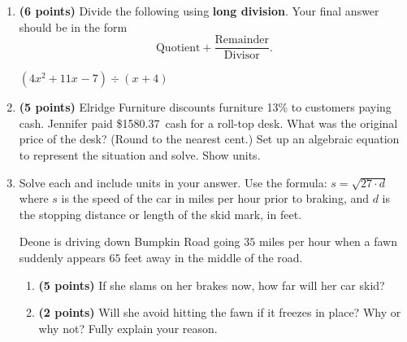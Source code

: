 \documentclass[12pt]{amsart}
\begin{document}
\begin{enumerate}
  
\vfill \vfill \vfill
\def \a{4}\def \b{4}\def \c{-5}\def \r{13}\def \monicpol{x^{}+4}\def \longnbad{4x^{2}+11x^{}-7}\def \anspol{4x^{}-5}
\item {\bf (6 points)} 
 Divide the following using {\bf long division}. Your final answer should be in the form $$ \text{Quotient} + \dfrac{\text{Remainder}}{\text{Divisor}}.$$

\vspace{3mm}

$(\longnbad) \div (\monicpol)$

\vfill  \vfill \vfill
\newpage\def \discount{13}\def \paid{1580.37}\def \rainy{9.35}\def \orcost{1816.52}\def \purcost{1398.56}\def \orrainy{10.75}
\item {\bf (5 points)} 
 Elridge Furniture discounts furniture \discount\% to customers paying cash. Jennifer paid \$\paid\ cash for a roll-top desk. What was the original price of the desk? (Round to the nearest cent.) Set up an algebraic equation to represent the situation and solve. Show units.

\vfill 
\def \insvar{27}\def \d{65}\def \zerospeed{41.89}\def \slimit{35}\def \s{52}\def \skidd{100.148}\def \safed{45.37}\def \rsafed{45}

 
\item Solve each and include units in your answer. Use the formula: $s = \sqrt{\insvar \cdot d}$ where $s$ is the speed of the car in miles per hour prior to braking, and $d$ is the stopping distance or length of the skid mark, in feet. 

\vspace{3mm}

Deone is driving down Bumpkin Road going $\slimit$ miles per hour when a fawn suddenly appears $\d$ feet away in the middle of the road. \begin{enumerate}
\item {\bf (5 points)} If she slams on her brakes now, how far will her car skid? \vspace{4cm}
\item {\bf (2 points)} Will she avoid hitting the fawn if it freezes in place? Why or why not? Fully explain your reason. \vspace{3cm}
\end{enumerate}



\end{enumerate}
\end{document}

